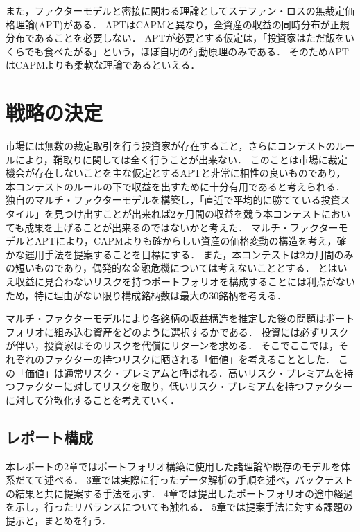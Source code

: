 \documentclass[11pt]{jreport}
\begin{document}
また，ファクターモデルと密接に関わる理論としてステファン・ロスの無裁定価格理論(APT)\cite{Ross}がある．
APTはCAPMと異なり，全資産の収益の同時分布が正規分布であることを必要しない．
APTが必要とする仮定は，「投資家はただ飯をいくらでも食べたがる」という，ほぼ自明の行動原理のみである\cite{analyst}．
そのためAPTはCAPMよりも柔軟な理論であるといえる．

\section{戦略の決定}

市場には無数の裁定取引を行う投資家が存在すること，さらにコンテストのルールにより，鞘取りに関しては全く行うことが出来ない．
このことは市場に裁定機会が存在しないことを主な仮定とするAPTと非常に相性の良いものであり，本コンテストのルールの下で収益を出すために十分有用であると考えられる．
独自のマルチ・ファクターモデルを構築し，「直近で平均的に勝てている投資スタイル」を見つけ出すことが出来れば2ヶ月間の収益を競う本コンテストにおいても成果を上げることが出来るのではないかと考えた．
マルチ・ファクターモデルとAPTにより，CAPMよりも確からしい資産の価格変動の構造を考え，確かな運用手法を提案することを目標にする．
また，本コンテストは2カ月間のみの短いものであり，偶発的な金融危機については考えないこととする．
とはいえ収益に見合わないリスクを持つポートフォリオを構成することには利点がないため，特に理由がない限り構成銘柄数は最大の30銘柄を考える．

マルチ・ファクターモデルにより各銘柄の収益構造を推定した後の問題はポートフォリオに組み込む資産をどのように選択するかである．
投資には必ずリスクが伴い，投資家はそのリスクを代償にリターンを求める．
そこでここでは，それぞれのファクターの持つリスクに晒される「価値」を考えることとした．
この「価値」は通常リスク・プレミアムと呼ばれる．高いリスク・プレミアムを持つファクターに対してリスクを取り，低いリスク・プレミアムを持つファクターに対して分散化することを考えていく．

\subsection{レポート構成}
本レポートの2章ではポートフォリオ構築に使用した諸理論や既存のモデルを体系だてて述べる．
3章では実際に行ったデータ解析の手順を述べ，バックテストの結果と共に提案する手法を示す．
4章では提出したポートフォリオの途中経過を示し，行ったリバランスについても触れる．
5章では提案手法に対する課題の提示と，まとめを行う．
\end{document}

